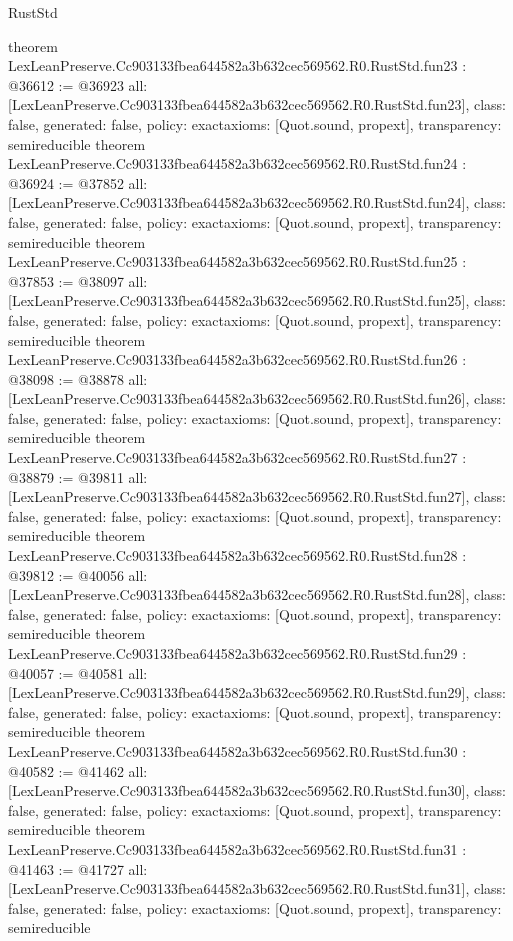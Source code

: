 \begin{lexlean}{RustStd}
\begin{coremodule}
{}
theorem LexLeanPreserve.Cc903133fbea644582a3b632cec569562.R0.RustStd.fun23 : @36612 := @36923 {
  all: [LexLeanPreserve.Cc903133fbea644582a3b632cec569562.R0.RustStd.fun23],
  class: false,
  generated: false,
  policy: exact{axioms: [Quot.sound, propext]},
  transparency: semireducible
}
theorem LexLeanPreserve.Cc903133fbea644582a3b632cec569562.R0.RustStd.fun24 : @36924 := @37852 {
  all: [LexLeanPreserve.Cc903133fbea644582a3b632cec569562.R0.RustStd.fun24],
  class: false,
  generated: false,
  policy: exact{axioms: [Quot.sound, propext]},
  transparency: semireducible
}
theorem LexLeanPreserve.Cc903133fbea644582a3b632cec569562.R0.RustStd.fun25 : @37853 := @38097 {
  all: [LexLeanPreserve.Cc903133fbea644582a3b632cec569562.R0.RustStd.fun25],
  class: false,
  generated: false,
  policy: exact{axioms: [Quot.sound, propext]},
  transparency: semireducible
}
theorem LexLeanPreserve.Cc903133fbea644582a3b632cec569562.R0.RustStd.fun26 : @38098 := @38878 {
  all: [LexLeanPreserve.Cc903133fbea644582a3b632cec569562.R0.RustStd.fun26],
  class: false,
  generated: false,
  policy: exact{axioms: [Quot.sound, propext]},
  transparency: semireducible
}
theorem LexLeanPreserve.Cc903133fbea644582a3b632cec569562.R0.RustStd.fun27 : @38879 := @39811 {
  all: [LexLeanPreserve.Cc903133fbea644582a3b632cec569562.R0.RustStd.fun27],
  class: false,
  generated: false,
  policy: exact{axioms: [Quot.sound, propext]},
  transparency: semireducible
}
theorem LexLeanPreserve.Cc903133fbea644582a3b632cec569562.R0.RustStd.fun28 : @39812 := @40056 {
  all: [LexLeanPreserve.Cc903133fbea644582a3b632cec569562.R0.RustStd.fun28],
  class: false,
  generated: false,
  policy: exact{axioms: [Quot.sound, propext]},
  transparency: semireducible
}
theorem LexLeanPreserve.Cc903133fbea644582a3b632cec569562.R0.RustStd.fun29 : @40057 := @40581 {
  all: [LexLeanPreserve.Cc903133fbea644582a3b632cec569562.R0.RustStd.fun29],
  class: false,
  generated: false,
  policy: exact{axioms: [Quot.sound, propext]},
  transparency: semireducible
}
theorem LexLeanPreserve.Cc903133fbea644582a3b632cec569562.R0.RustStd.fun30 : @40582 := @41462 {
  all: [LexLeanPreserve.Cc903133fbea644582a3b632cec569562.R0.RustStd.fun30],
  class: false,
  generated: false,
  policy: exact{axioms: [Quot.sound, propext]},
  transparency: semireducible
}
theorem LexLeanPreserve.Cc903133fbea644582a3b632cec569562.R0.RustStd.fun31 : @41463 := @41727 {
  all: [LexLeanPreserve.Cc903133fbea644582a3b632cec569562.R0.RustStd.fun31],
  class: false,
  generated: false,
  policy: exact{axioms: [Quot.sound, propext]},
  transparency: semireducible
}
\end{coremodule}
\end{lexlean}
